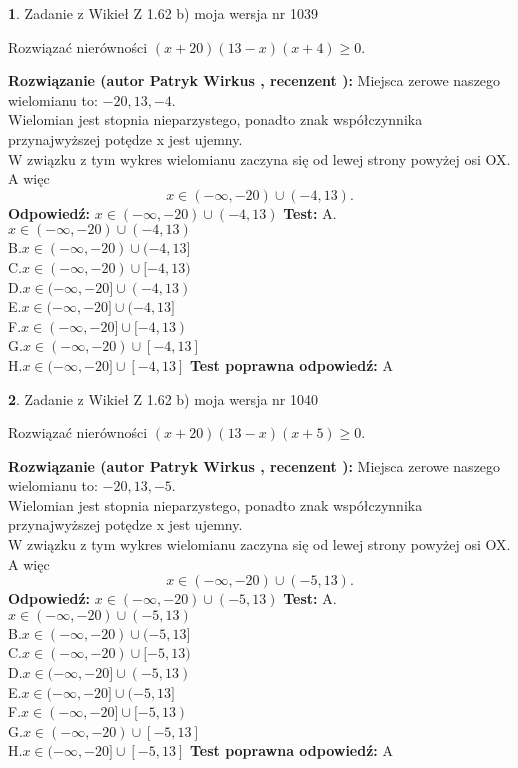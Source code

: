 \documentclass[12pt, a4paper]{article}
\theoremstyle{definition} %
\newtheorem{zad}{}
\newcommand{\zadStart}[1]{\begin{zad}#1\newline}
\newcommand{\zadStop}{\end{zad}}
\newcommand{\rozwStart}[2]{\noindent \textbf{Rozwiązanie (autor #1 , recenzent #2): }\newline}
\newcommand{\rozwStop}{\newline}
\newcommand{\odpStart}{\noindent \textbf{Odpowiedź:}\newline}
\newcommand{\odpStop}{\newline}
\newcommand{\testStart}{\noindent \textbf{Test:}\newline}
\newcommand{\testStop}{\newline}
\newcommand{\kluczStart}{\noindent \textbf{Test poprawna odpowiedź:}\newline}
\newcommand{\kluczStop}{\newline}
\begin{document}
\zadStart{Zadanie z Wikieł Z 1.62 b) moja wersja nr 1039}

Rozwiązać nierówności $(x+20)(13-x)(x+4)\ge0$.
\zadStop
\rozwStart{Patryk Wirkus}{}
Miejsca zerowe naszego wielomianu to: $-20, 13, -4$.\\
Wielomian jest stopnia nieparzystego, ponadto znak współczynnika przy\linebreak najwyższej potędze x jest ujemny.\\ W związku z tym wykres wielomianu zaczyna się od lewej strony powyżej osi OX. A więc $$x \in (-\infty,-20) \cup (-4,13).$$
\rozwStop
\odpStart
$x \in (-\infty,-20) \cup (-4,13)$
\odpStop
\testStart
A.$x \in (-\infty,-20) \cup (-4,13)$\\
B.$x \in (-\infty,-20) \cup (-4,13]$\\
C.$x \in (-\infty,-20) \cup [-4,13)$\\
D.$x \in (-\infty,-20] \cup (-4,13)$\\
E.$x \in (-\infty,-20] \cup (-4,13]$\\
F.$x \in (-\infty,-20] \cup [-4,13)$\\
G.$x \in (-\infty,-20) \cup [-4,13]$\\
H.$x \in (-\infty,-20] \cup [-4,13]$
\testStop
\kluczStart
A
\kluczStop



\zadStart{Zadanie z Wikieł Z 1.62 b) moja wersja nr 1040}

Rozwiązać nierówności $(x+20)(13-x)(x+5)\ge0$.
\zadStop
\rozwStart{Patryk Wirkus}{}
Miejsca zerowe naszego wielomianu to: $-20, 13, -5$.\\
Wielomian jest stopnia nieparzystego, ponadto znak współczynnika przy\linebreak najwyższej potędze x jest ujemny.\\ W związku z tym wykres wielomianu zaczyna się od lewej strony powyżej osi OX. A więc $$x \in (-\infty,-20) \cup (-5,13).$$
\rozwStop
\odpStart
$x \in (-\infty,-20) \cup (-5,13)$
\odpStop
\testStart
A.$x \in (-\infty,-20) \cup (-5,13)$\\
B.$x \in (-\infty,-20) \cup (-5,13]$\\
C.$x \in (-\infty,-20) \cup [-5,13)$\\
D.$x \in (-\infty,-20] \cup (-5,13)$\\
E.$x \in (-\infty,-20] \cup (-5,13]$\\
F.$x \in (-\infty,-20] \cup [-5,13)$\\
G.$x \in (-\infty,-20) \cup [-5,13]$\\
H.$x \in (-\infty,-20] \cup [-5,13]$
\testStop
\kluczStart
A
\kluczStop
\end{document}
